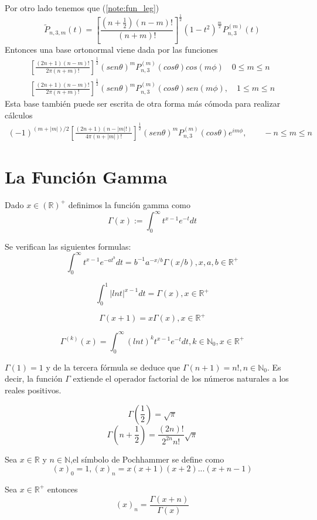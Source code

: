 Por otro lado tenemos que (\hyperref[]{\ref{note:fun_leg}})
$$ 
\tilde{P}_{n,3,m}(t)= \left[\frac{(n+\frac{1}{2})(n-m)!}{(n+m)!}\right]^\frac{1}{2} (1-t^2)^{\frac{m}{2}}P_{n,3}^{(m)}(t)
$$
Entonces una base ortonormal viene dada por las funciones
\begin{gather}
\left[\frac{(2n+1)(n-m)!}{2\pi(n+m)!}\right]^{\frac{1}{2}} (sen\theta)^{m}P_{n,3}^{(m)}(cos\theta)cos(m\phi) \quad 0 \le m \le n \\
\left[\frac{(2n+1)(n-m)!}{2\pi(n+m)!}\right]^{\frac{1}{2}} (sen\theta)^{m}P_{n,3}^{(m)}(cos\theta)sen(m\phi), \quad 1\le m \le n 
\end{gather}
Esta base también puede ser escrita de otra forma más cómoda para realizar cálculos
\begin{gather}
(-1)^{(m+|m|)/2}\left[\frac{(2n+1)(n-|m|!)}{4\pi(n+|m|)!}\right]^{\frac{1}{2}} (sen \theta)^m P_{n,3}^{(m)}(cos\theta)e^{im\phi}, \qquad -n\le m \le n
\end{gather}

\appendix
\chapter{La Función Gamma}\label{aped.A}
\begin{defn} Dado $x\in\mathds{(R)^+}$ definimos la función gamma como
	$$
	\Gamma(x) := \int_{0}^{\infty} t^{x-1}e^{-t}dt		
	$$
\end{defn}
\begin{prop}Se verifican las siguientes formulas:
	$$
	\int_{0}^{\infty}  t^{x-1}e^{-at^b}dt = b^{-1}a^{-x/b}\Gamma(x/b)  , x,a,b \in \mathds{R}^+
	$$
	
	$$
	\int_{0}^{1} |ln t|^{x-1}dt = \Gamma(x),   x \in \mathds{R}^+
	$$
	
	$$
	\Gamma(x+1) = x \Gamma(x) ,		x\in \mathds{R}^+
	$$
	
	$$
	\Gamma^{(k)}(x) = \int_{0}^{\infty} (ln t)^k t^{x-1} e^{-t} dt,   k\in\mathds{N}_0,x\in\mathds{R}^+
	$$
\end{prop}
\begin{rem}
	$\Gamma(1)=1$ y de la tercera fórmula se deduce que $\Gamma(n+1)=n!, n\in\mathds{N}_0$. Es decir, la función $\Gamma$ extiende el operador factorial de los números naturales a los reales positivos.
\end{rem}
\begin{lem} 
	$$
	\Gamma(\frac{1}{2}) = 	\sqrt{\pi}
	$$
	$$
	\Gamma(n+\frac{1}{2})=\frac{(2n)!}{2^{2n}n!} \sqrt{\pi}
	$$
\end{lem}
\begin{defn}Sea $x\in\mathds{R}$ y $n\in\mathds{N}$,el símbolo de Pochhammer se define como
	$$
	(x)_0 = 1, (x)_n=x(x+1)(x+2)...(x+n-1)
	$$
\end{defn}
\begin{prop} Sea $x\in\mathds{R}^+$ entonces
	$$
	(x)_n = \frac{\Gamma(x+n)}{\Gamma(x)}
	$$
\end{prop}
